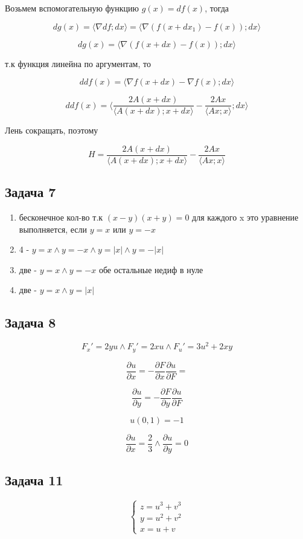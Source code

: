 \documentclass[a4paper,12pt]{article}
\begin{document}
Возьмем вспомогательную функцию $g(x) = df(x)$, тогда

\[
dg(x) = \langle \nabla df; dx \rangle = \langle \nabla (f(x+dx_1)-f(x)); dx \rangle
\]

\[
dg(x) =  \langle \nabla (f(x+dx)-f(x)); dx \rangle
\]

т.к функция линейна по аргументам, то 

\[
ddf(x) =  \langle \nabla f(x+dx)-\nabla f(x); dx \rangle
\]

\[
ddf(x) = \langle \frac{2A(x+dx)}{\langle A(x+dx); x+dx \rangle}-\frac{2Ax}{\langle Ax; x \rangle}; dx \rangle
\]

Лень сокращать, поэтому 

\[
H = \frac{2A(x+dx)}{\langle A(x+dx); x+dx \rangle}-\frac{2Ax}{\langle Ax; x \rangle}
\]

\subsection{Задача 7}
\begin{enumerate}
    \item бесконечное кол-во т.к $(x-y)(x+y) = 0$ для каждого x это уравнение выполняется, если $y=x$ или $y=-x$
    \item 4 - $y=x \land y=-x \land y=|x| \land y= -|x|$
    \item две - $y=x \land y=-x$ обе остальные недиф в нуле
    \item две  - $y=x \land y=|x|$
\end{enumerate}

\subsection{Задача 8}
\[
F_x' =2yu \land F_y' = 2xu \land F_u' = 3u^2+2xy 
\]

\[
\frac{\partial u}{\partial x} = -\frac{\partial F}{\partial x} \frac{\partial u}{\partial F} = 
\]

\[
\frac{\partial u}{\partial y} = -\frac{\partial F}{\partial y} \frac{\partial u}{\partial F}
\]

\[
u(0, 1) = -1
\]

\[
\frac{\partial u}{\partial x} = \frac{2}{3} \land \frac{\partial u}{\partial y} = 0
\]

\subsection{Задача 11}
\[
\begin{cases}
    z = u^3 + v^3 \\
    y = u^2 + v^2 \\
    x = u+v
\end{cases}
\]
\end{document}
